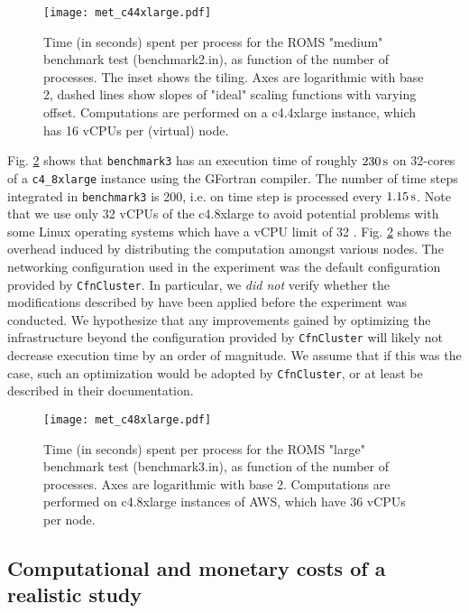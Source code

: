 \documentclass[12pt,a4paper]{article}
\begin{document}
\begin{figure}[H]
	\centering
	\texttt{[image: met\_c44xlarge.pdf]}
	\caption{Time (in seconds) spent per process for the ROMS "medium" benchmark test (benchmark2.in), as function of the number of processes. The inset shows the tiling. Axes are logarithmic with base 2, dashed lines show slopes of "ideal" scaling functions with varying offset. Computations are performed on a c4.4xlarge instance, which has 16 vCPUs per (virtual) node.}
	\label{fig:met_c44xlarge}
\end{figure}

Fig. \ref{fig:met_c48xlarge} shows that \verb|benchmark3| has an execution time of roughly $230\,\rm s$ on 32-cores of a \verb|c4_8xlarge| instance using the GFortran compiler. The number of time steps integrated in  \verb|benchmark3| is 200, i.e. on time step is processed every $1.15\,\rm s $. Note that we use only 32 vCPUs of the c4.8xlarge to avoid potential problems with some Linux operating systems which have a vCPU limit of 32 \citep{web:ec2_c4}. 
Fig. \ref{fig:met_c48xlarge} shows the overhead induced by distributing the computation amongst various nodes. The networking configuration used in the experiment was the default configuration provided by \verb|CfnCluster|. In particular, we \emph{did not} verify whether the modifications described by \cite{web:cyclempi} \citep[see also][]{web:ibmMpiTrick} have been applied before the experiment was conducted. We hypothesize that any improvements gained by optimizing the infrastructure beyond the configuration provided by \verb|CfnCluster| will likely not decrease execution time by an order of magnitude. We assume that if this was the case, such an optimization would be adopted by \verb|CfnCluster|, or at least be described in their documentation.

\begin{figure}[H]
	\centering
	\texttt{[image: met\_c48xlarge.pdf]}
	\caption{Time (in seconds) spent per process for the ROMS "large" benchmark test (benchmark3.in), as function of the number of processes.  Axes are logarithmic with base 2. Computations are performed on c4.8xlarge instances of AWS, which have 36 vCPUs per node.}
	\label{fig:met_c48xlarge}
\end{figure}

\subsection{Computational and monetary costs of a realistic study}
\end{document}
